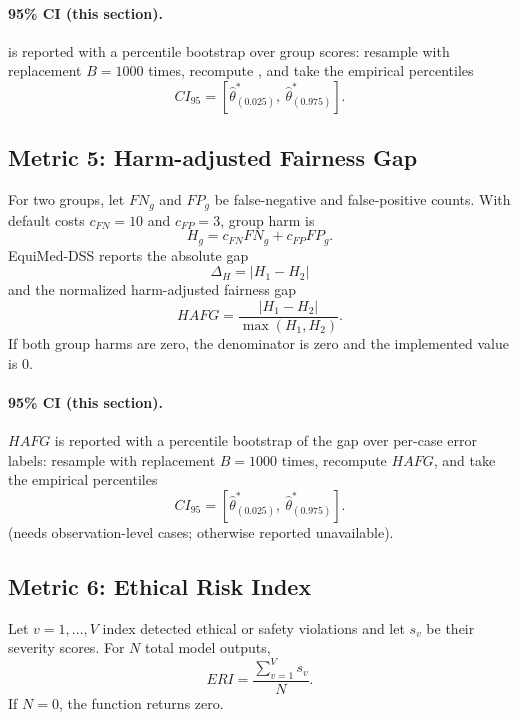 \documentclass[11pt]{article}
\begin{document}
\paragraph{95\% CI (this section).}  is reported with a percentile bootstrap over group scores: resample with replacement $B=1000$ times, recompute , and take the empirical percentiles
\begin{equation}
CI_{95}=\left[\hat\theta^{\ast}_{(0.025)},\ \hat\theta^{\ast}_{(0.975)}\right].
\end{equation}

\subsection{Metric 5: Harm-adjusted Fairness Gap}

For two groups, let $FN_g$ and $FP_g$ be false-negative and false-positive
counts. With default costs $c_{FN}=10$ and $c_{FP}=3$, group harm is
\begin{equation}
H_g = c_{FN}FN_g+c_{FP}FP_g.
\end{equation}
EquiMed-DSS reports the absolute gap
\begin{equation}
\Delta_H = |H_1-H_2|
\end{equation}
and the normalized harm-adjusted fairness gap
\begin{equation}
HAFG=\frac{|H_1-H_2|}{\max(H_1,H_2)}.
\end{equation}
If both group harms are zero, the denominator is zero and the implemented value
is $0$.


\paragraph{95\% CI (this section).} $HAFG$ is reported with a percentile bootstrap of the gap over per-case error labels: resample with replacement $B=1000$ times, recompute $HAFG$, and take the empirical percentiles
\begin{equation}
CI_{95}=\left[\hat\theta^{\ast}_{(0.025)},\ \hat\theta^{\ast}_{(0.975)}\right].
\end{equation} (needs observation-level cases; otherwise reported unavailable).

\subsection{Metric 6: Ethical Risk Index}

Let $v=1,\ldots,V$ index detected ethical or safety violations and let $s_v$ be
their severity scores. For $N$ total model outputs,
\begin{equation}
ERI = \frac{\sum_{v=1}^{V}s_v}{N}.
\end{equation}
If $N=0$, the function returns zero.
\end{document}
